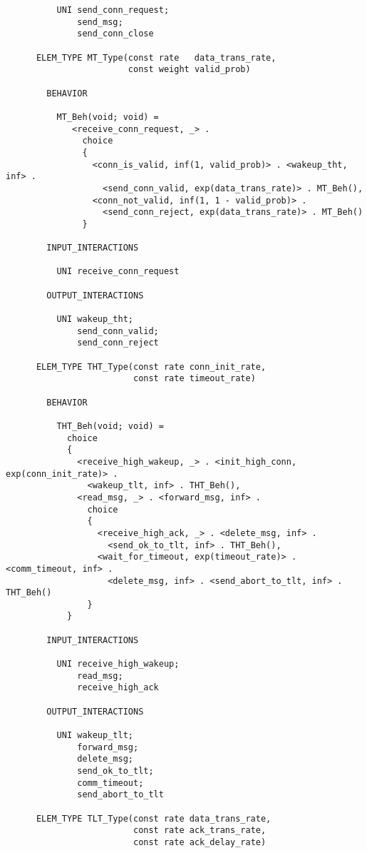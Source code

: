 \begin{verbatim}
          UNI send_conn_request;
              send_msg;
              send_conn_close

      ELEM_TYPE MT_Type(const rate   data_trans_rate,
                        const weight valid_prob)

        BEHAVIOR

          MT_Beh(void; void) =
             <receive_conn_request, _> .
               choice
               {
                 <conn_is_valid, inf(1, valid_prob)> . <wakeup_tht, inf> .
                   <send_conn_valid, exp(data_trans_rate)> . MT_Beh(),
                 <conn_not_valid, inf(1, 1 - valid_prob)> .
                   <send_conn_reject, exp(data_trans_rate)> . MT_Beh()
               }

        INPUT_INTERACTIONS

          UNI receive_conn_request

        OUTPUT_INTERACTIONS

          UNI wakeup_tht;
              send_conn_valid;
              send_conn_reject

      ELEM_TYPE THT_Type(const rate conn_init_rate,
                         const rate timeout_rate)

        BEHAVIOR

          THT_Beh(void; void) =
            choice
            {
              <receive_high_wakeup, _> . <init_high_conn, exp(conn_init_rate)> .
                <wakeup_tlt, inf> . THT_Beh(),
              <read_msg, _> . <forward_msg, inf> .
                choice
                {
                  <receive_high_ack, _> . <delete_msg, inf> .
                    <send_ok_to_tlt, inf> . THT_Beh(),
                  <wait_for_timeout, exp(timeout_rate)> . <comm_timeout, inf> .
                    <delete_msg, inf> . <send_abort_to_tlt, inf> . THT_Beh()
                }
            }

        INPUT_INTERACTIONS

          UNI receive_high_wakeup;
              read_msg;
              receive_high_ack

        OUTPUT_INTERACTIONS

          UNI wakeup_tlt;
              forward_msg;
              delete_msg;
              send_ok_to_tlt;
              comm_timeout;
              send_abort_to_tlt

      ELEM_TYPE TLT_Type(const rate data_trans_rate,
                         const rate ack_trans_rate,
                         const rate ack_delay_rate)


\end{verbatim}
